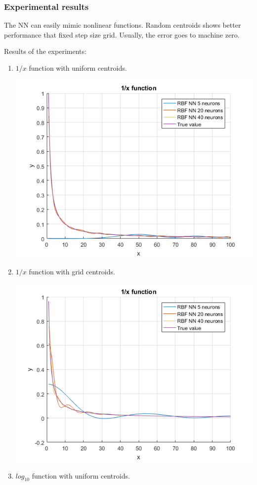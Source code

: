\documentclass[a4paper, 12pt]{article}
\begin{document}


\subsubsection{Experimental results}

The NN can easily mimic nonlinear functions. Random centroids shows better performance that fixed step size grid. Usually, the error goes to machine zero. 

Results of the experiments:
\begin{enumerate}
\newpage
\item $1/x$ function with uniform centroids.

\includegraphics[scale = 0.8]{f11.png}

\item $1/x$ function with grid centroids.

\includegraphics[scale = 0.8]{f1.png}
\newpage
\item $log_{10}$ function with uniform centroids.


\end{enumerate}
\end{document}
